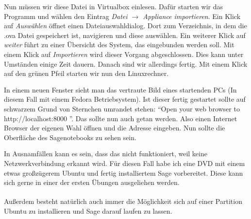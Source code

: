 \documentclass[a4paper,10pt]{article}
\begin{document}


Nun müssen wir diese Datei in Virtualbox einlesen. Dafür starten wir das Programm und wählen den Eintrag \emph{Datei $\to$ Appliance importieren}. 
Ein Klick auf \emph{Auswählen} öffnet einen Dateiauswahldialog. Dort zum Verzeichnis, in dem die .ova Datei gespeichert ist, navigieren und diese auswählen.
Ein weiterer Klick auf \emph{weiter} führt zu einer Übersicht des System, das eingebunden werden soll.
Mit einem Klick auf \emph{Importieren} wird dieser Vorgang abgeschlossen. Dies kann unter Umständen einige Zeit dauern. Danach sind wir allerdings fertig.
Mit einem Klick auf den grünen Pfeil starten wir nun den Linuxrechner.

In einem neuen Fenster sieht man das vertraute Bild eines startenden PCs (In diesem Fall mit einem Fedora Betriebsystem). 
Ist dieser fertig gestartet sollte auf schwarzem Grund von Sternchen umrandet stehen: 
\textquotedblleft Open your web browser to http://localhost:8000  \textquotedblright.
Das sollte nun auch getan werden. Also einen Internet Browser der eigenen Wahl öffnen und die Adresse eingeben. Nun sollte die Oberfläche des
Sagenotebooks zu sehen sein. 

In Ausnamfällen kann es sein, dass das nicht funktioniert, weil keine Netzwerkverbindung erkannt wird. Für diesen Fall habe ich eine
DVD mit einem etwas großzügerem Ubuntu und fertig installiertem Sage vorbereitet. Diese kann sich gerne in einer der ersten Übungen
ausgeliehen werden.
\paragraph{}
Außerdem besteht natürlich auch immer die Möglichkeit sich auf einer Partition Ubuntu zu installieren und Sage darauf laufen zu lassen.
\end{document}
